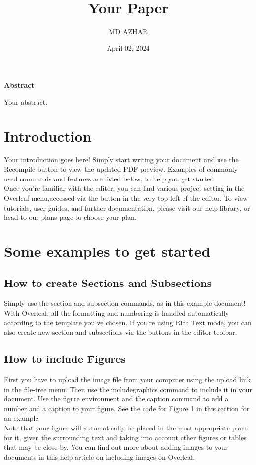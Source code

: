 \documentclass{article}
\title{Your Paper}
\author{MD AZHAR}
\date{April 02, 2024}
\begin{document}
	
	\maketitle
	\begin{center}
		\textbf{Abstract}
	\end{center}
	Your abstract.
	
	\section{Introduction}
	Your introduction goes here! Simply start writing your document and use the Recompile button to
	view the updated PDF preview. Examples of commonly used commands and features are listed below,
	to help you get started.\\
	\indent Once you’re familiar with the editor, you can find various project setting in the Overleaf menu,accessed via the button in the very top left of the editor. To view tutorials, user guides, and further documentation, please visit our help library, or head to our plans page to choose your plan.
	
	\section{Some examples to get started}
	\subsection{How to create Sections and Subsections}
	Simply use the section and subsection commands, as in this example document! With Overleaf, all
	the formatting and numbering is handled automatically according to the template you’ve chosen. If you’re using Rich Text mode, you can also create new section and subsections via the buttons in the editor toolbar.
	\subsection{How to include Figures}
	First you have to upload the image file from your computer using the upload link in the file-tree menu. Then use the includegraphics command to include it in your document. Use the figure environment and the caption command to add a number and a caption to your figure. See the code for Figure 1 in this section for an example.\\ 
	\indent Note that your figure will automatically be placed in the most appropriate place for it, given the
	surrounding text and taking into account other figures or tables that may be close by. You can find out more about adding images to your documents in this help article on including images on Overleaf.
	
\end{document}
